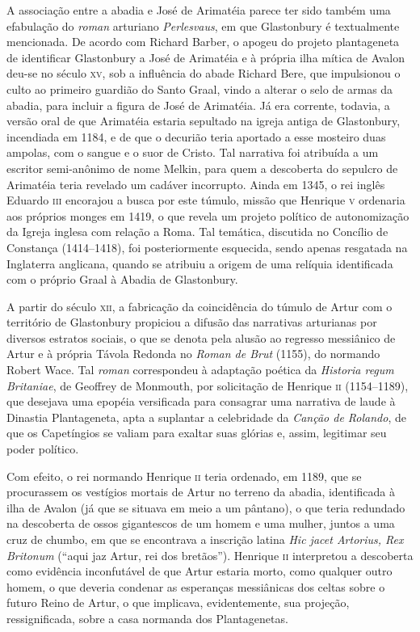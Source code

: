 A associação entre a abadia e José de Arimatéia parece ter sido também
uma efabulação do \textit{roman} arturiano \textit{Perlesvaus}, em que
Glastonbury é textualmente mencionada. De acordo com Richard Barber, o
apogeu do projeto plantageneta de identificar Glastonbury a José de
Arimatéia e à própria ilha mítica de Avalon deu-se no século \textsc{xv}, sob a
influência do abade Richard Bere, que impulsionou o culto ao primeiro
guardião do Santo Graal, vindo a alterar o selo de armas da abadia,
para incluir a figura de José de Arimatéia. Já era corrente, todavia, a
versão oral de que Arimatéia estaria sepultado na igreja antiga de
Glastonbury, incendiada em 1184, e de que o decurião teria aportado a
esse mosteiro duas ampolas, com o sangue e o suor de Cristo. Tal
narrativa foi atribuída a um escritor semi-anônimo de nome Melkin, para
quem a descoberta do sepulcro de Arimatéia teria revelado um cadáver
incorrupto. Ainda em 1345, o rei inglês Eduardo \textsc{iii} encorajou a busca
por este túmulo, missão que Henrique \textsc{v} ordenaria aos próprios monges em
1419, o que revela um projeto político de autonomização da Igreja
inglesa com relação a Roma. Tal temática, discutida no Concílio de
Constança (1414--1418), foi posteriormente esquecida, sendo apenas
resgatada na Inglaterra anglicana, quando se atribuiu a origem de uma
relíquia identificada com o próprio Graal à Abadia de Glastonbury.

A partir do século \textsc{xii}, a fabricação da coincidência do túmulo de Artur
com o território de Glastonbury propiciou a difusão das narrativas
arturianas por diversos estratos sociais, o que se denota pela alusão
ao regresso messiânico de Artur e à própria Távola Redonda no
\textit{Roman de Brut} (1155), do normando Robert Wace. Tal
\textit{roman} correspondeu à adaptação poética da \textit{Historia
regum Britaniae}, de Geoffrey de Monmouth, por solicitação de Henrique
\textsc{ii} (1154--1189), que desejava uma epopéia versificada para consagrar uma
narrativa de laude à Dinastia Plantageneta, apta a suplantar a
celebridade da \textit{Canção de Rolando}, de que os Capetíngios se
valiam para exaltar suas glórias e, assim, legitimar seu poder
político. 

Com efeito, o rei normando Henrique \textsc{ii} teria ordenado, em 1189, que se
procurassem os vestígios mortais de Artur no terreno da abadia,
identificada à ilha de Avalon (já que se situava em meio a um pântano),
o que teria redundado na descoberta de ossos gigantescos de um homem e
uma mulher, juntos a uma cruz de chumbo, em que se encontrava a
inscrição latina \textit{Hic jacet Artorius, Rex Britonum} (“aqui jaz
Artur, rei dos bretãos”). Henrique \textsc{ii} interpretou a descoberta como
evidência inconfutável de que Artur estaria morto, como qualquer outro
homem, o que deveria condenar as esperanças messiânicas dos celtas
sobre o futuro Reino de Artur, o que implicava, evidentemente, sua
projeção, ressignificada, sobre a casa normanda dos Plantagenetas.

